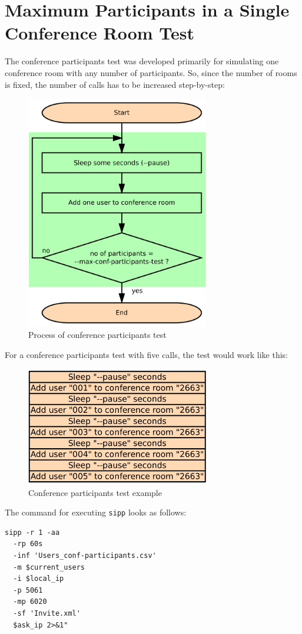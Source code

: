 \section{Maximum Participants in a Single Conference Room Test}
\label{sec:conf-participants-test}

The conference participants test was developed primarily for simulating one conference room with any
number of participants. So, since the number of rooms is fixed, the number of calls has to be increased step-by-step:

\begin{figure} [!ht]
\centering
\includegraphics [width=8cm] {conf-participants-test-1}
\caption{Process of conference participants test}
\end{figure}

\newpage
For a conference participants test with five calls, the test would work like this: 
\begin{figure} [!ht]
\centering
\includegraphics [width=8cm] {conf-participants-test-2}
\caption{Conference participants test example}
\end{figure}

The command for executing \texttt{sipp} looks as follows:

\begin{lstlisting}[breaklines=true,label=code:conf-room-invite,caption={sipp command for starting conference participants tests} ]
sipp -r 1 -aa
  -rp 60s
  -inf 'Users_conf-participants.csv'
  -m $current_users
  -i $local_ip
  -p 5061
  -mp 6020
  -sf 'Invite.xml'
  $ask_ip 2>&1"
\end{lstlisting}
